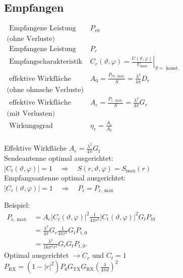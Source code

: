\documentclass[english]{latex4ei/latex4ei_sheet}
\begin{document}
\begin{sectionbox}
\subsection{Empfangen}
$\begin{array}{ll}
	\text { Empfangene Leistung } & P_{r 0} \\  
	\text{(ohne Verluste)}	&\\
	\text { Empfangene Leistung } & P_{r} \\ 
	\text { Empfangscharakteristik } & C_{r}(\vartheta, \varphi)=\left.\frac{U(\vartheta, \varphi)}{U_{\max }}\right|_{S=\text { konst. }} \\
	\text { effektive Wirkfläche } & A_{0}=\frac{P_{r 0, \max }}{S}=\frac{\lambda^{2}}{4 \pi} D_{r} \\
	\text{(ohne ohmsche Verluste)}	&\\ 
	\text { effektive Wirkfläche } & A_{e}=\frac{P_{r, \max }}{S}=\frac{\lambda^{2}}{4 \pi} G_{r} \\  
	\text{(mit Verlusten)}&\\
	 \text { Wirkungsgrad} & \eta_{r}=\frac{A_{e}}{A_{0}} \\
\end{array}$

\end{sectionbox}
\begin{sectionbox}

\begin{emphbox}
\begin{flushleft}
Effektive Wirkfläche 	$A_{e}=\frac{\lambda^{2}}{4 \pi}G_{\mathrm{r}}$\\
Sendeantenne optimal ausgerichtet:\\
$\left|C_{t}(\vartheta, \varphi)\right|=1 \quad \Rightarrow \quad S(r, \vartheta, \varphi)=S_{\max }(r)$\\
Empfangsantenne optimal ausgerichtet:\\
$\left|C_{r}(\vartheta, \varphi)\right|=1 \quad \Rightarrow \quad P_{\mathrm{r}}=P_{\mathrm{r}, \max }$
\end{flushleft}
\end{emphbox}
\end{sectionbox}
\begin{sectionbox}
	Beispiel: \\
	$\begin{aligned} P_{\mathrm{r}, \max } &=A_{e}\left|C_{\mathrm{r}}(\vartheta, \varphi)\right|^{2} \frac{1}{4 \pi r^{2}}\left|C_{\mathrm{t}}(\vartheta, \varphi)\right|^{2} G_{t} P_{t 0}\\ 
		&=\frac{\lambda^{2}}{4 \pi} G_{r} \frac{1}{4 \pi r^{2}} G_{t} P_{\mathrm{t}, 0} \\
		&=\frac{\lambda^{2}}{16 \pi^{2} r^{2}} G_{r} G_{t} P_{\mathrm{t}, 0} . \end{aligned}$\\
	Optimal ausgerichtet $\rightarrow C_r$ und $C_t=1$\\
	$P_{\mathrm{RX}}=\left(1-|r|^{2}\right) P_{0} G_{\mathrm{TX}} G_{\mathrm{RX}}\left(\frac{\lambda}{4 \pi d}\right)^{2}$
\end{sectionbox}
\end{document}
